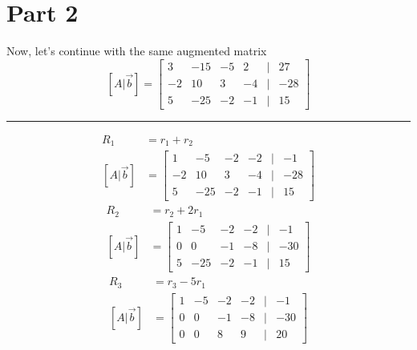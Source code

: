 \documentclass{article}
\begin{document}
\newcommand{\hr}{\par\noindent\rule{\textwidth}{0.4pt}}

\newcommand{\bc}[1]{
	\begin{equation*}
		\begin{boxed}
			{#1}
		\end{boxed}
	\end{equation*}
}

\newcommand{\cond}[2]{
	\ifmmode
		{#1} \quad {#2}
	\else
		$$ {#1} \quad {#2} $$
	\fi
}

\tableofcontents

\section{Part 2}
Now, let's continue with the same augmented matrix
$$
	[A|\vec{b}] = \begin{bmatrix}
		3 & -15 & -5 & 2 & | & 27 \\
		-2 & 10 & 3 & -4 & | & -28 \\
		5 & -25 & -2 & -1 & | & 15
	\end{bmatrix}
$$
\hr
\begin{align*}
	R_1 & = r_1 + r_2 \\
	[A|\vec{b}] & = \begin{bmatrix}
		1 & -5 & -2 & -2 & | & -1 \\
		-2 & 10 & 3 & -4 & | & -28 \\
		5 & -25 & -2 & -1 & | & 15
	\end{bmatrix}
\end{align*}
\begin{align*}
	R_2 & = r_2 + 2r_1 \\
	[A|\vec{b}] & = \begin{bmatrix}
		1 & -5 & -2 & -2 & | & -1 \\
		0 & 0 & -1 & -8 & | & -30 \\
		5 & -25 & -2 & -1 & | & 15
	\end{bmatrix}
\end{align*}
\begin{align*}
	R_3 & = r_3 - 5r_1 \\
	[A|\vec{b}] & = \begin{bmatrix}
		1 & -5 & -2 & -2 & | & -1 \\
		0 & 0 & -1 & -8 & | & -30 \\
		0 & 0 & 8 & 9 & | & 20
	\end{bmatrix}
\end{align*}
\end{document}
